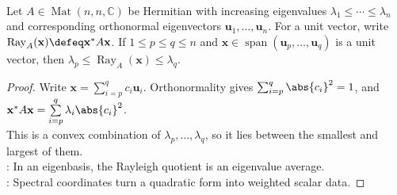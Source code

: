 \begin{theorem} \label{thm:rayleigh-quotient-spectral-interval} \\
Let $A\in\operatorname{Mat}(n,n,\mathbb{C})$ be Hermitian with increasing eigenvalues $\lambda_1\leq\cdots\leq\lambda_n$ and corresponding orthonormal eigenvectors $\mathbf{u}_1,\ldots,\mathbf{u}_n$. For a unit vector, write $\operatorname{Ray}_A(\mathbf{x})\defeq\mathbf{x}^*A\mathbf{x}$. If $1\leq p\leq q\leq n$ and $\mathbf{x}\in\operatorname{span}(\mathbf{u}_p,\ldots,\mathbf{u}_q)$ is a unit vector, then $\lambda_p\leq \operatorname{Ray}_A(\mathbf{x})\leq \lambda_q$.
\begin{proof}
Write $\mathbf{x}=\sum_{i=p}^{q}c_i\mathbf{u}_i$. Orthonormality gives $\sum_{i=p}^{q}\abs{c_i}^2=1$, and $\mathbf{x}^*A\mathbf{x} =\sum\limits_{i=p}^{q}\lambda_i\abs{c_i}^2$.\\
This is a convex combination of $\lambda_p,\ldots,\lambda_q$, so it lies between the smallest and largest of them.\\
: In an eigenbasis, the Rayleigh quotient is an eigenvalue average.\\
: Spectral coordinates turn a quadratic form into weighted scalar data.
\end{proof}
\end{theorem}

